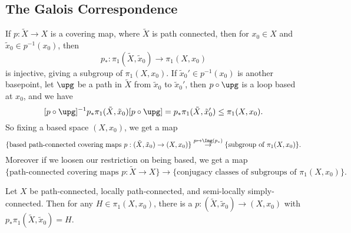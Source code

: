 \documentclass[12pt]{article}
\begin{document}
\subsection{The Galois Correspondence}
\label{sub:gal_cor}

If $p : \tilde X \to X$ is a covering map, where $\tilde X$ is path connected, then for $x_0 \in X$ and $\tilde x_0 \in p^{-1}(x_0)$, then
\[
p_\ast : \pi_1(\tilde X, \tilde x_0) \to \pi_1(X, x_0)
\]
is injective, giving a subgroup of $\pi_1(X, x_0)$. If $\tilde x_0' \in p^{-1}(x_0)$ is another basepoint, let $\upg$ be a path in $\tilde X$ from $\tilde x_0$ to $\tilde x_0'$, then $p \circ \upg$ is a loop based at $x_0$, and we have
\[
	[p \circ \upg]^{-1} p_\ast \pi_1(\tilde X, \tilde x_0) [p \circ \upg] = p_\ast \pi_1(\tilde X, \tilde x_0') \leq \pi_1(X, x_0).
\]
So fixing a based space $(X, x_0)$, we get a map
\[
\{\text{based path-connected covering maps } p : (\tilde X, \tilde x_0) \to (X, x_0)\} \overset{p \mapsto \Img(p_\ast)}{\to}\{\text{subgroup of } \pi_1(X, x_0)\}.
\]
Moreover if we loosen our restriction on being based, we get a map
\[
	\{\text{path-connected covering maps } p : \tilde X \to X\} \to \{\text{conjugacy classes of subgroups of }\pi_1(X, x_0)\}.
\]

\begin{proposition}[Surjectivity]
	Let $X$ be path-connected, locally path-connected, and semi-locally simply-connected. Then for any $H \in \pi_1(X, x_0)$, there is a $p : (\tilde X, \tilde x_0) \to (X, x_0)$ with $p_\ast \pi_1(\tilde X, \tilde x_0) = H$.
\end{proposition}
\end{document}
